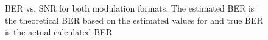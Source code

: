 \begin{figure} 
    \centering
  \caption{BER vs. SNR for both modulation formats. The estimated BER is the theoretical BER based on the estimated values for \ebnot and true BER is the actual calculated BER}
  \label{fig:ber_vs_snr} 
\end{figure}